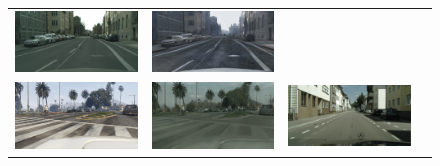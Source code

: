 \begin{figure}[h]
{\begin{tabular}{cc cc}
    \includegraphics[width=\myw, height=\myh]{figs/gta-cityscapes/cityscapes-03655-fs8.png} &
    \includegraphics[width=\myw, height=\myh]{figs/gta-cityscapes/fake-gta-03655-fs8.png}
   \\
    \includegraphics[width=\myw, height=\myh]{figs/gta-cityscapes/gta-02612-fs8.png} &
    \includegraphics[width=\myw, height=\myh]{figs/gta-cityscapes/fake-cityscapes-02612-fs8.png} &
    \includegraphics[width=\myw, height=\myh]{figs/gta-cityscapes/cityscapes-02612-fs8.png} &

\end{tabular}}
\end{figure}
